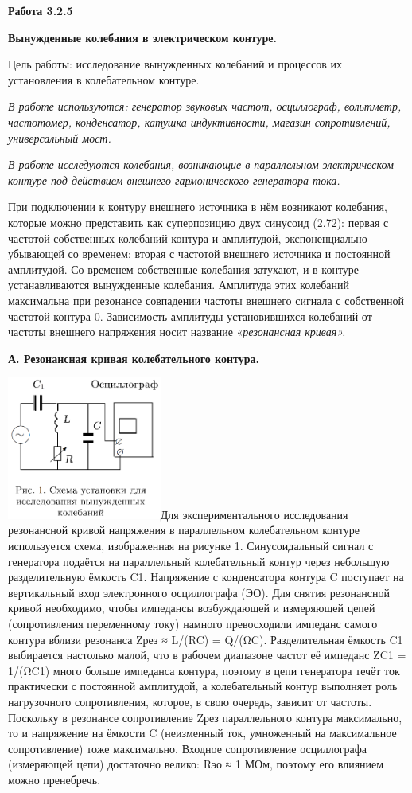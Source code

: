 \textbf{Работа 3.2.5}

\textbf{Вынужденные колебания в электрическом контуре.}

Цель работы: исследование вынужденных колебаний и процессов их
установления в колебательном контуре.

\emph{В работе используются: генератор звуковых частот, осциллограф,
вольтметр, частотомер, конденсатор, катушка индуктивности, магазин
сопротивлений, универсальный мост.}

\emph{В работе исследуются колебания, возникающие в параллельном
электрическом контуре под действием внешнего гармонического генератора
тока. }

При подключении к контуру внешнего источника в нём возникают колебания,
которые можно представить как суперпозицию двух синусоид (2.72): первая
с частотой собственных колебаний контура и амплитудой, экспоненциально
убывающей со временем; вторая с частотой внешнего источника и постоянной
амплитудой. Со временем собственные колебания затухают, и в контуре
устанавливаются вынужденные колебания. Амплитуда этих колебаний
максимальна при резонансе совпадении частоты внешнего сигнала с
собственной частотой контура 0. Зависимость амплитуды установившихся
колебаний от частоты внешнего напряжения носит название
«\emph{резонансная кривая».}

\textbf{А. Резонансная кривая колебательного контура.}

\includegraphics[width=1.99792in,height=1.85in]{./media/image1.png}Для
экспериментального исследования резонансной кривой напряжения в
параллельном колебательном контуре используется схема, изображенная на
рисунке 1. Синусоидальный сигнал с генератора подаётся на параллельный
колебательный контур через небольшую разделительную ёмкость C1.
Напряжение с конденсатора контура C поступает на вертикальный вход
электронного осциллографа (ЭО). Для снятия резонансной кривой
необходимо, чтобы импедансы возбуждающей и измеряющей цепей
(сопротивления переменному току) намного превосходили импеданс самого
контура вблизи резонанса Zрез ≈ L/(RC) = Q/(ΩC). Разделительная ёмкость
C1 выбирается настолько малой, что в рабочем диапазоне частот её
импеданс ZC1 = 1/(ΩC1) много больше импеданса контура, поэтому в цепи
генератора течёт ток практически с постоянной амплитудой, а
колебательный контур выполняет роль нагрузочного сопротивления, которое,
в свою очередь, зависит от частоты. Поскольку в резонансе сопротивление
Zрез параллельного контура максимально, то и напряжение на ёмкости C
(неизменный ток, умноженный на максимальное сопротивление) тоже
максимально. Входное сопротивление осциллографа (измеряющей цепи)
достаточно велико: Rэо ≈ 1 МОм, поэтому его влиянием можно пренебречь.

